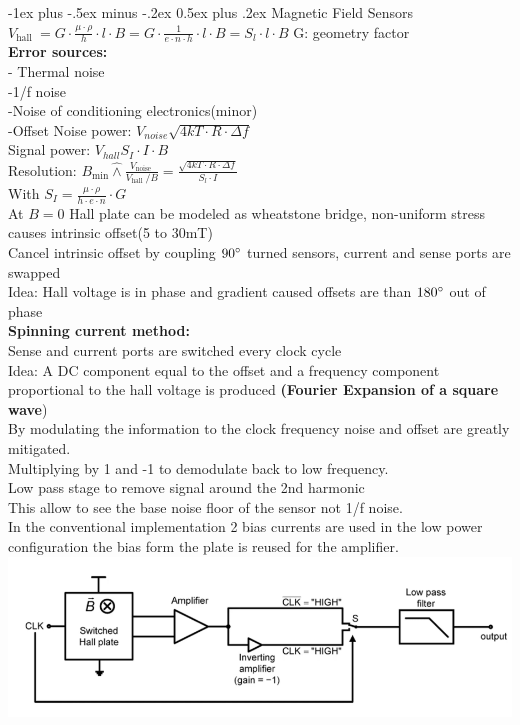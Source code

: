 \documentclass[5pt]{article}
\makeatletter
\renewcommand{\section}{\@startsection{section}{1}{0mm}%
                                {-1ex plus -.5ex minus -.2ex}%
                                {0.5ex plus .2ex}%
                                {\normalfont\large\bfseries}}
\makeatother
\begin{document}
\begin{multicols*}{4}
\section{Magnetic Field Sensors}
$ V_{\text {hall }}=G \cdot \frac{\mu \cdot \rho}{h} \cdot l \cdot B=G \cdot \frac{1}{e \cdot n \cdot h} \cdot l \cdot B=S_{l} \cdot l \cdot B $
G: geometry factor\\
\textbf{Error sources:}\\
- Thermal noise\\
-1/f noise \\
-Noise of conditioning electronics(minor)\\
-Offset
Noise power: $ V_{noise} \sqrt{4kT \cdot R \cdot \Delta f} $\\
Signal power: $ V_{hall} S_I \cdot I \cdot B $\\
Resolution: $ B_{\min } \hat{\wedge} \frac{V_{\text {noise }}}{V_{\text {hall }} / B}=\frac{\sqrt{4 k T \cdot R \cdot \Delta f}}{S_{l} \cdot I} $\\
With $ S_I = \frac{\mu \cdot \rho}{h\cdot e \cdot n} \cdot G $\\
At $ B=0 $ Hall plate can be modeled as wheatstone bridge, non-uniform stress causes intrinsic offset(5 to 30mT)\\
Cancel intrinsic offset by coupling $90 \degree  $ turned sensors, current and sense ports are swapped\\
Idea: Hall voltage is in phase and gradient caused offsets are than $ 180 \degree $ out of phase\\
\textbf{Spinning current method:}\\
Sense and current ports are switched every clock cycle\\
Idea: A DC component equal to the offset and a frequency component proportional to the hall voltage is produced \textbf{(Fourier Expansion of a square wave})\\
By modulating the information to the clock frequency noise and offset are greatly mitigated.\\
Multiplying by 1 and -1 to demodulate back to low frequency. \\
Low pass stage to remove signal around the 2nd harmonic\\
This allow to see the base noise floor of the sensor not 1/f noise.\\
In the conventional implementation 2 bias currents are used in the low power configuration the bias form the plate is reused for the amplifier.\\
\includegraphics[width=\columnwidth]{images/switched_hall_system.png}

\end{multicols*}
\end{document}
